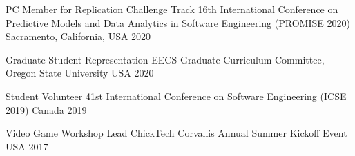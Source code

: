 


\begin{cvhonors}

  \cvhonor
    {PC Member for Replication Challenge Track} %
    {16th International Conference on Predictive Models and Data Analytics in Software Engineering ({PROMISE} 2020)} %
    {Sacramento, California, USA} %
    {2020} %

\end{cvhonors}



\begin{cvhonors}

  \cvhonor
    {Graduate Student Representation} %
    {EECS Graduate Curriculum Committee, Oregon State University} %
    {USA} %
    {2020} %

  \cvhonor
    {Student Volunteer} %
    {41st International Conference on Software Engineering ({ICSE} 2019)} %
    {Canada} %
    {2019} %

  \cvhonor
    {Video Game Workshop Lead} %
    {ChickTech Corvallis Annual Summer Kickoff Event} %
    {USA} %
    {2017} %

\end{cvhonors}



